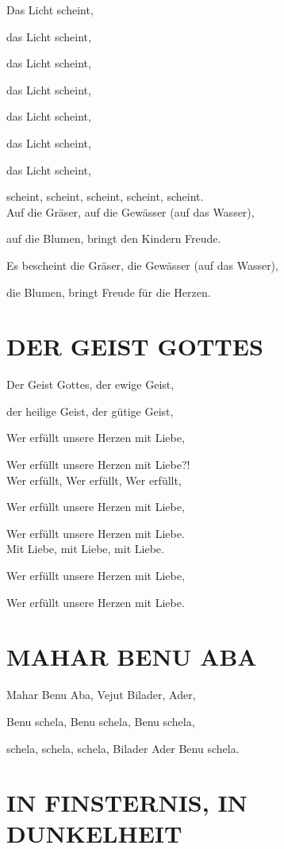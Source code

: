 \documentclass[11pt,a5paper,twoside]{article}
\begin{document}
Das Licht scheint,

das Licht scheint,

das Licht scheint,

das Licht scheint,

das Licht scheint,

das Licht scheint,

das Licht scheint,

scheint, scheint, scheint, scheint, scheint.\\


Auf die Gräser, auf die Gewässer (auf das Wasser), 

auf die Blumen, bringt den Kindern Freude. 

Es bescheint die Gräser, die Gewässer (auf das Wasser), 

die Blumen, bringt Freude für die Herzen.

\section[Der Geist Gottes]{DER GEIST GOTTES}

Der Geist Gottes, der ewige Geist,

der heilige Geist, der gütige Geist, 

Wer erfüllt unsere Herzen mit Liebe, 

Wer erfüllt unsere Herzen mit Liebe?!\\

Wer erfüllt, Wer erfüllt, Wer erfüllt,

Wer erfüllt unsere Herzen mit Liebe,

Wer erfüllt unsere Herzen mit Liebe.\\


Mit Liebe, mit Liebe, mit Liebe.

Wer erfüllt unsere Herzen mit Liebe,

Wer erfüllt unsere Herzen mit Liebe.



\section[Mahar Benu Aba]{MAHAR BENU ABA}

Mahar Benu Aba, Vejut Bilader, Ader,

Benu schela, Benu schela, Benu schela,

schela, schela, schela, Bilader Ader Benu schela.\\

\section[In Finsternis, in Dunkelheit]{IN FINSTERNIS, IN DUNKELHEIT}
\end{document}

